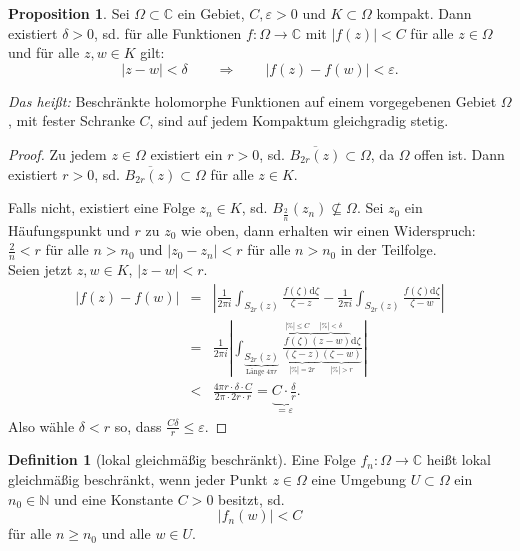 \documentclass[11pt,titlepage]{article}
\theoremstyle{definition}
\newtheorem{proposition}[theorem]{Proposition}
\newtheorem{definition}[theorem]{Definition}
\theoremstyle{remark}
\begin{document}
	\begin{proposition} \label{prop:beschr;hol}
		Sei $\Omega\subset\mathbb{C}$ ein Gebiet, $C,\varepsilon>0$ und $K\subset\Omega$ kompakt. Dann 
		existiert $\delta>0$, sd. für alle Funktionen $f:\Omega\to\mathbb{C}$ mit $|f(z)|<C$ für alle $z\in\Omega$ 
		und für alle $z,w\in K$ gilt:
		\[ |z-w|<\delta \qquad \Rightarrow\qquad |f(z)-f(w)|<\varepsilon .\]
	\end{proposition}
	
	\textsl{Das heißt:} Beschränkte holomorphe Funktionen auf einem vorgegebenen Gebiet $\Omega$, mit fester 
	Schranke $C$, sind auf jedem Kompaktum gleichgradig stetig.
	
	\begin{proof}
		Zu jedem $z\in\Omega$ existiert ein $r>0$, sd. $\overline{B_{2r}(z)}\subset\Omega$, da $\Omega$ offen ist. 
		Dann existiert $r>0$, sd. $\overline{B_{2r}(z)}\subset\Omega$ für alle $z\in K$. 
		
		
		
		
		Falls nicht, existiert 
		eine Folge $z_n\in K$, sd. $B_{\frac{2}{n}}(z_n)\nsubseteq\Omega$. Sei $z_0$ ein Häufungspunkt und 
		$r$ zu $z_0$ wie oben, dann erhalten wir einen Widerspruch: $\frac{2}{n}<r$ für alle $n>n_0$ und 
		$|z_0 -z_n|<r$ für alle $n>n_0$ in der Teilfolge. \\
		
		
		
		
		Seien jetzt $z,w\in K$, $|z-w|<r$.
		\begin{eqnarray*}
			|f(z)-f(w)|&=&\left| \frac{1}{2\pi i}\int_{S_{2r}(z)}\frac{f(\zeta)\mathrm{d}\zeta}{\zeta -z} -
			\frac{1}{2\pi i} \int_{S_{2r}(z)}\frac{f(\zeta)\mathrm{d}\zeta}{\zeta -w} \right| \\
			&=& \frac{1}{2\pi i} \left| \int_{\underbrace{S_{2r}(z)}_{\text{Länge }4\pi r}}
			 \frac{\overbrace{f(\zeta)}^{|\%|\leq C}\overbrace{(z-w)}^{|\%|<\delta}\mathrm{d}\zeta}
			 {\underbrace{(\zeta -z)}_{|\%|=2r}\underbrace{(\zeta -w)}_{|\%|>r}} \right| \\
			 &<& \frac{4\pi r\cdot \delta \cdot C}{2\pi \cdot 2r \cdot r}=\underbrace{C\cdot \frac{\delta}{r}}
			 _{=\varepsilon}.
		\end{eqnarray*}
		Also wähle $\delta <r$ so, dass $\frac{C\delta}{r}\leq\varepsilon$.
	\end{proof}
	
	\begin{definition}[lokal gleichmäßig beschränkt]
		Eine Folge $f_n:\Omega\to\mathbb{C}$ heißt lokal gleichmäßig beschränkt, wenn jeder Punkt $z\in\Omega$ 
		eine Umgebung $U\subset\Omega$ ein $n_0\in\mathbb{N}$ und eine Konstante $C>0$ besitzt, sd. 
		\[ |f_n(w)|<C \]
		für alle $n\geq n_0$ und alle $w\in U$.
	\end{definition}
	
\end{document}
